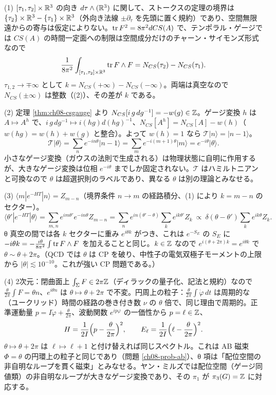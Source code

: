 \begin{solution}
(1) $[\tau_1,\tau_2]\times\mathbb{R}^3$ の向き $d\tau\wedge(\mathbb{R}^3)$ に関して、ストークスの定理の境界は $\{\tau_2\}\times\mathbb{R}^3-\{\tau_1\}\times\mathbb{R}^3$（外向き法線 $\pm\partial_\tau$ を先頭に置く規約）であり、空間無限遠からの寄与は仮定によりない。$\tr F^2=8\pi^2dCS(A)$ で、テンポラル・ゲージでは $CS(A)$ の時間一定面への制限は空間成分だけのチャーン・サイモンズ形式なので
\[
\frac1{8\pi^2}\int_{[\tau_1,\tau_2]\times\mathbb{R}^3}\tr F\wedge F=N_{CS}(\tau_2)-N_{CS}(\tau_1).
\]
$\tau_{1,2}\to\mp\infty$ として $k=N_{CS}(+\infty)-N_{CS}(-\infty)$。両端は真空なので $N_{CS}(\pm\infty)$ は整数（(2)）、その差が $k$ である。

(2) 定理 \ref{thm:ch08-csgauge} より $N_{CS}[i\,g\,dg^{-1}]=-w(g)\in\mathbb{Z}$。ゲージ変換 $h$ は $A\mapsto A^h$ で、$i\,g\,dg^{-1}\mapsto i(hg)d(hg)^{-1}$、$N_{CS}[A^h]=N_{CS}[A]-w(h)$（$w(hg)=w(h)+w(g)$ と整合）。よって $w(h)=1$ なら $\mathcal T\lvert n\rangle=\lvert n-1\rangle$。
\[
\mathcal T\lvert\theta\rangle=\sum_ne^{-in\theta}\lvert n-1\rangle=\sum_me^{-i(m+1)\theta}\lvert m\rangle=e^{-i\theta}\lvert\theta\rangle .
\]
小さなゲージ変換（ガウスの法則で生成される）は物理状態に自明に作用するが、大きなゲージ変換は位相 $e^{-i\theta}$ までしか固定されない。$\mathcal T$ はハミルトニアンと可換なので $\theta$ は超選択則のラベルであり、異なる $\theta$ は別の理論とみなせる。

(3) $\langle m|e^{-HT}|n\rangle=Z_{m-n}$（境界条件 $n\to m$ の経路積分、(1) により $k=m-n$ のセクター）。
\[
\langle\theta'|e^{-HT}|\theta\rangle=\sum_{m,n}e^{im\theta'}e^{-in\theta}Z_{m-n}=\sum_ne^{in(\theta'-\theta)}\sum_ke^{ik\theta'}Z_k\ \propto\ \delta(\theta-\theta')\sum_ke^{ik\theta}Z_k .
\]
θ 真空の間では各 $k$ セクターに重み $e^{i\theta k}$ がつき、これは $e^{-S_E}$ の $S_E$ に $-i\theta k=-\frac{i\theta}{8\pi^2}\int\tr F\wedge F$ を加えることと同じ。$k\in\mathbb{Z}$ なので $e^{i(\theta+2\pi)k}=e^{i\theta k}$ で $\theta\sim\theta+2\pi$。（QCD では $\theta$ は CP を破り、中性子の電気双極子モーメントの上限から $\lvert\theta\rvert\lesssim10^{-10}$。これが強い CP 問題である。）

(4) 2次元：閉曲面上 $\int_\Sigma F\in2\pi\mathbb{Z}$（ディラックの量子化、記法と規約）なので $\frac{\theta}{2\pi}\int F=\theta n$、$e^{i\theta n}$ は $\theta\mapsto\theta+2\pi$ で不変。円周上の粒子：$\frac{\theta}{2\pi}\int\dot\varphi\,dt$ は周期的な（ユークリッド）時間の経路の巻き付き数 $\nu$ の $\theta$ 倍で、同じ理由で周期的。正準運動量 $p=I\dot\varphi+\frac{\theta}{2\pi}$、波動関数 $e^{ip\varphi}$ の一価性から $p=\ell\in\mathbb{Z}$、
\[
H=\frac{1}{2I}\Bigl(p-\frac{\theta}{2\pi}\Bigr)^2,\qquad E_\ell=\frac{1}{2I}\Bigl(\ell-\frac{\theta}{2\pi}\Bigr)^2 .
\]
$\theta\mapsto\theta+2\pi$ は $\ell\mapsto\ell+1$ と付け替えれば同じスペクトル。これは AB 磁束 $\Phi=\theta$ の円環上の粒子と同じであり（問題 \ref{ch08-prob-ab}）、θ 項は「配位空間の非自明なループを貫く磁束」とみなせる。ヤン・ミルズでは配位空間（ゲージ同値類）の非自明なループが大きなゲージ変換であり、その $\pi_1$ が $\pi_3(G)=\mathbb{Z}$ に対応する。
\end{solution}

